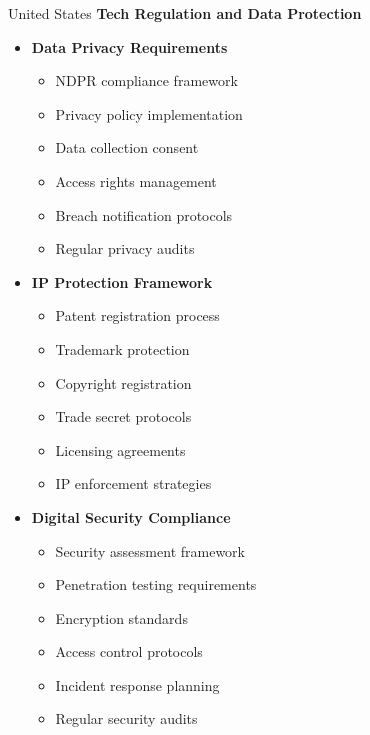 \begin{regionalbox}{United States}
\textbf{Tech Regulation and Data Protection}
\begin{itemize}
    \item \textbf{Data Privacy Requirements}
    \begin{itemize}
        \item NDPR compliance framework
        \item Privacy policy implementation
        \item Data collection consent
        \item Access rights management
        \item Breach notification protocols
        \item Regular privacy audits
    \end{itemize}

    \item \textbf{IP Protection Framework}
    \begin{itemize}
        \item Patent registration process
        \item Trademark protection
        \item Copyright registration
        \item Trade secret protocols
        \item Licensing agreements
        \item IP enforcement strategies
    \end{itemize}

    \item \textbf{Digital Security Compliance}
    \begin{itemize}
        \item Security assessment framework
        \item Penetration testing requirements
        \item Encryption standards
        \item Access control protocols
        \item Incident response planning
        \item Regular security audits
    \end{itemize}
\end{itemize}


\end{regionalbox}
